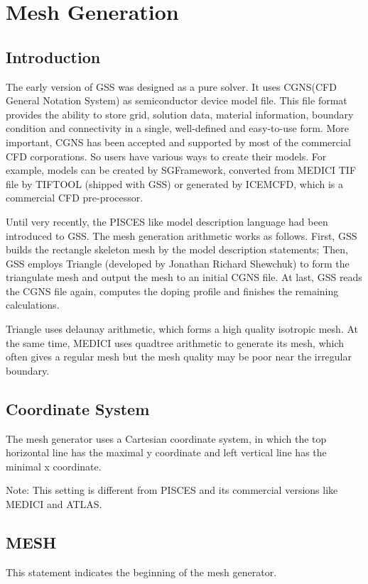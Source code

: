 \documentclass[11pt,pdftex]{article}
\begin{document}
\newpage
\section{Mesh Generation}
\subsection{Introduction}
The early version of GSS was designed as a pure solver. It uses
CGNS(CFD General Notation System) as semiconductor device model
file. This file format provides the ability to store grid, solution
data, material information, boundary condition and connectivity in a
single, well-defined and easy-to-use form. More important, CGNS has
been accepted and supported by most of the commercial CFD
corporations. So users have various ways to create their models. For
example, models can be created by SGFramework, converted from MEDICI
TIF file by TIFTOOL (shipped with GSS) or generated by ICEMCFD,
which is a commercial CFD pre-processor.

Until very recently, the PISCES like model description language had
been introduced to GSS. The mesh generation arithmetic works as
follows. First, GSS builds the rectangle skeleton mesh by the model
description statements; Then, GSS employs Triangle (developed by
Jonathan Richard Shewchuk) to form the triangulate mesh and output
the mesh to an initial CGNS file. At last, GSS reads the CGNS file
again, computes the doping profile and finishes the remaining
calculations.

Triangle uses delaunay arithmetic, which forms a high quality
isotropic mesh. At the same time, MEDICI uses quadtree arithmetic to
generate its mesh, which often gives a regular mesh but the mesh
quality may be poor near the irregular boundary.

\subsection{Coordinate System}
The mesh generator uses a Cartesian coordinate system, in which the
top horizontal line has the maximal y coordinate and left vertical
line has the minimal x coordinate.

Note: This setting is different from PISCES and its commercial
versions like MEDICI and ATLAS.

\newpage
\subsection{MESH}
This statement indicates the beginning of the mesh generator.
\end{document}
